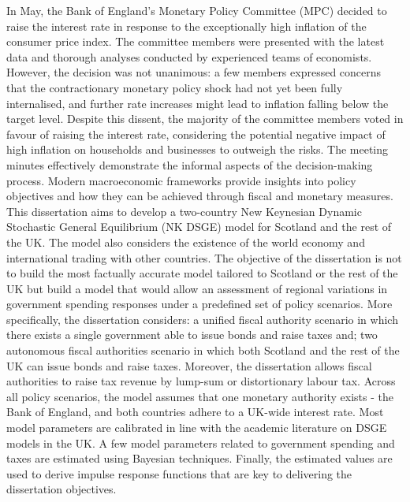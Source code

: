 In May, the Bank of England's Monetary Policy Committee (MPC) decided to raise the interest rate in response to the exceptionally high inflation of the consumer price index. The committee members were presented with the latest data and thorough analyses conducted by experienced teams of economists. However, the decision was not unanimous: a few members expressed concerns that the contractionary monetary policy shock had not yet been fully internalised, and further rate increases might lead to inflation falling below the target level. Despite this dissent, the majority of the committee members voted in favour of raising the interest rate, considering the potential negative impact of high inflation on households and businesses to outweigh the risks. The meeting minutes effectively demonstrate the informal aspects of the decision-making process. Modern macroeconomic frameworks provide insights into policy objectives and how they can be achieved through fiscal and monetary measures. This dissertation aims to develop a two-country New Keynesian Dynamic Stochastic General Equilibrium (NK DSGE) model for Scotland and the rest of the UK. The model also considers the existence of the world economy and international trading with other countries. The objective of the dissertation is not to build the most factually accurate model tailored to Scotland or the rest of the UK but build a model that would allow an assessment of regional variations in government spending responses under a predefined set of policy scenarios. More specifically, the dissertation considers: a unified fiscal authority scenario in which there exists a single government able to issue bonds and raise taxes and; two autonomous fiscal authorities scenario in which both Scotland and the rest of the UK can issue bonds and raise taxes. Moreover, the dissertation allows fiscal authorities to raise tax revenue by lump-sum or distortionary labour tax. Across all policy scenarios, the model assumes that one monetary authority exists - the Bank of England, and both countries adhere to a UK-wide interest rate. Most model parameters are calibrated in line with the academic literature on DSGE models in the UK. A few model parameters related to government spending and taxes are estimated using Bayesian techniques. Finally, the estimated values are used to derive impulse response functions that are key to delivering the dissertation objectives.

